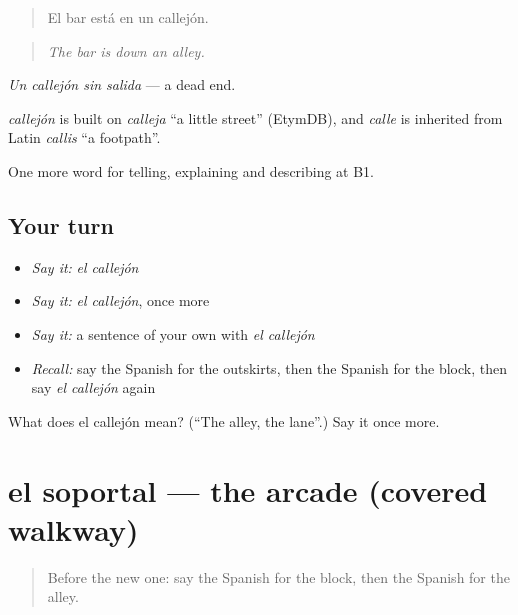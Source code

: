 \begin{quote}
El bar está en un callejón.
\end{quote}

\begin{quote}
\emph{The bar is down an alley.}
\end{quote}

\emph{Un callejón sin salida} — a dead end.

\begin{cousinweb}
\emph{callejón} is built on \emph{calleja} \textquotedblleft{}a little street\textquotedblright{} (EtymDB), and \emph{calle} is inherited from Latin \emph{callis} \textquotedblleft{}a footpath\textquotedblright{}.
\end{cousinweb}

\begin{grammarlens}[title={What you've built}]
One more word for telling, explaining and describing at B1.
\end{grammarlens}

\subsection*{Your turn}
\begin{itemize}
\raggedright
  \item \emph{Say it:} \emph{el callejón}
  \item \emph{Say it:} \emph{el callejón}, once more
  \item \emph{Say it:} a sentence of your own with \emph{el callejón}
  \item \emph{Recall:} say the Spanish for the outskirts, then the Spanish for the block, then say \emph{el callejón} again
\end{itemize}

\begin{tcolorbox}[breakable,colback=teal!4,colframe=teal!35!black,title={Before you move on}]
What does el callejón mean? (\textquotedblleft{}The alley, the lane\textquotedblright{}.) Say it once more.
\end{tcolorbox}
\section[el soportal]{el soportal — the arcade (covered walkway)}

\label{lesson:ES-C675-soportal}



\begin{quote}
Before the new one: say the Spanish for the block, then the Spanish for the alley.
\end{quote}

